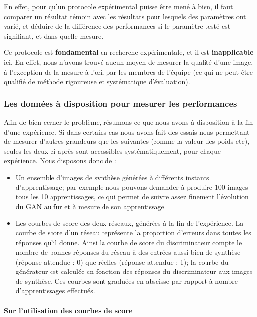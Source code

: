 En effet, pour qu'un protocole expérimental puisse être mené à bien, il faut comparer un résultat témoin avec les résultats pour lesquels des paramètres ont varié, et déduire de la différence des performances si le paramètre testé est signifiant, et dans quelle mesure.

Ce protocole est \textbf{fondamental} en recherche expérimentale, et il est \textbf{inapplicable} ici. En effet, nous n'avons trouvé aucun moyen de mesurer la qualité d'une image, à l'exception de la mesure à l’œil par les membres de l'équipe (ce qui ne peut être qualifié de méthode rigoureuse et systématique d'évaluation). 

\subsubsection{Les données à disposition pour mesurer les performances}

Afin de bien cerner le problème, résumons ce que nous avons à disposition à la fin d'une expérience. Si dans certains cas nous avons fait des essais nous permettant de mesurer d'autres grandeurs que les suivantes (comme la valeur des poids etc), seules les deux ci-après sont accessibles systématiquement, pour chaque expérience.
Nous disposons donc de :

\begin{itemize}
  \item Un ensemble d'images de synthèse générées à différents instants d'apprentissage; par exemple nous pouvons demander à produire 100 images tous les 10 apprentissages, ce qui permet de suivre assez finement l'évolution du GAN au fur et à mesure de son apprentissage
  \item Les courbes de score des deux réseaux, générées à la fin de l'expérience. La courbe de score d'un réseau représente la proportion d'erreurs dans toutes les réponses qu'il donne. Ainsi la courbe de score du discriminateur compte le nombre de bonnes réponses du réseau à des entrées aussi bien de synthèse (réponse attendue : 0) que réelles (réponse attendue : 1); la courbe du générateur est calculée en fonction des réponses du discriminateur aux images de synthèse. Ces courbes sont graduées en abscisse par rapport à nombre d'apprentissages effectués.
\end{itemize}

\paragraph{Sur l'utilisation des courbes de score}

